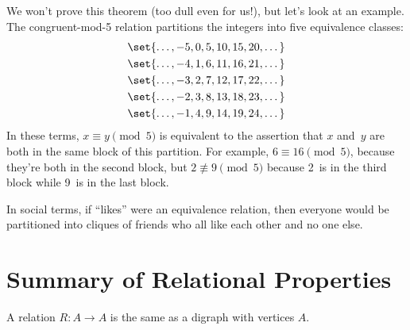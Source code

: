 We won't prove this theorem (too dull even for us!), but let's look at
an example.  The congruent-mod-5 relation partitions the integers into
five equivalence classes:
\begin{gather*}
    \set{ \dots, -5, 0, 5, 10, 15, 20, \dots } \\
    \set{ \dots, -4, 1, 6, 11, 16, 21, \dots } \\
    \set{ \dots, -3, 2, 7, 12, 17, 22, \dots } \\
    \set{ \dots, -2, 3, 8, 13, 18, 23, \dots } \\
    \set{ \dots, -1, 4, 9, 14, 19, 24, \dots }
\end{gather*}
In these terms, $x \equiv y \pmod{5}$ is equivalent to the assertion
that $x$ and~$y$ are both in the same block of this partition.  For
example, $6 \equiv 16 \pmod{5}$, because they're both in the second
block, but $2 \nequiv 9 \pmod{5}$ because 2~is in the third block
while 9~is in the last block.

In social terms, if ``likes'' were an equivalence relation, then
everyone would be partitioned into cliques of friends who all like
each other and no one else.

\begin{problems}
\homeworkproblems
{}
\end{problems}

\section{Summary of Relational Properties}\label{prop_summary_sec}

A relation $R: A \to A$ is the same as a digraph with vertices $A$.

